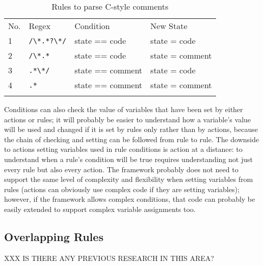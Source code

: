 \begin{table}[ht]
    \caption{Rules to parse C-style comments}
    \empty{}\label{Rules to parse C-style comments}
    \begin{tabular}{llll}
        \tabletopline{}%
        No.   & Regex             & Condition         & New State         \\
        \tablemiddleline{}%
        1     & \verb!/\*.*?\*/!  & state == code     & state = code      \\
        2     & \verb!/\*.*!      & state == code     & state = comment   \\
        3     & \verb!.*\*/!      & state == comment  & state = code      \\
        4     & \verb!.*!         & state == comment  & state = comment   \\
        \tablebottomline{}%
    \end{tabular}
\end{table}

Conditions can also check the value of variables that have been set by
either actions or rules; it will probably be easier to understand how a
variable's value will be used and changed if it is set by rules only rather
than by actions, because the chain of checking and setting can be followed
from rule to rule.  The downside to actions setting variables used in rule
conditions is action at a distance: to understand when a rule's condition
will be true requires understanding not just every rule but also every
action.  The framework probably does not need to support the same level of
complexity and flexibility when setting variables from rules (actions can
obviously use complex code if they are setting variables); however, if the
framework allows complex conditions, that code can probably be easily
extended to support complex variable assignments too.


\subsection{Overlapping Rules}

\label{overlapping rules in architecture}

XXX IS THERE ANY PREVIOUS RESEARCH IN THIS AREA\@?

